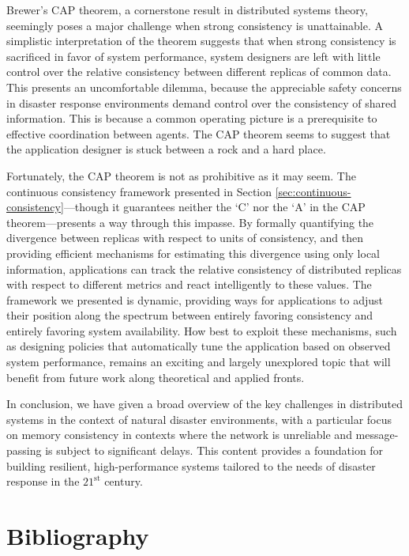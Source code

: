 \documentclass[]             %
{NASA}                       %
\theoremstyle{definition}
\begin{document}
Brewer's CAP theorem, a cornerstone result in distributed systems
theory, seemingly poses a major challenge when strong consistency is
unattainable. A simplistic interpretation of the theorem suggests that
when strong consistency is sacrificed in favor of system performance,
system designers are left with little control over the relative
consistency between different replicas of common data. This presents
an uncomfortable dilemma, because the appreciable safety concerns in
disaster response environments demand control over the consistency of
shared information. This is because a common operating picture is a
prerequisite to effective coordination between agents. The CAP theorem
seems to suggest that the application designer is stuck between a rock
and a hard place.

Fortunately, the CAP theorem is not as prohibitive as it may seem. The
continuous consistency framework presented in Section
\ref{sec:continuous-consistency}---though it guarantees neither the
`C' nor the `A' in the CAP theorem---presents a way through this
impasse. By formally quantifying the divergence between replicas with
respect to units of consistency, and then providing efficient
mechanisms for estimating this divergence using only local
information, applications can track the relative consistency of
distributed replicas with respect to different metrics and react
intelligently to these values. The framework we presented is dynamic,
providing ways for applications to adjust their position along the
spectrum between entirely favoring consistency and entirely favoring
system availability. How best to exploit these mechanisms, such as
designing policies that automatically tune the application based on
observed system performance, remains an exciting and largely
unexplored topic that will benefit from future work along theoretical
and applied fronts.

In conclusion, we have given a broad overview of the key challenges in
distributed systems in the context of natural disaster environments,
with a particular focus on memory consistency in contexts where the
network is unreliable and message-passing is subject to significant
delays. This content provides a foundation for building resilient,
high-performance systems tailored to the needs of disaster response in
the $21^\textrm{st}$ century.

\section*{Bibliography}\label{bibliography}



\end{document}
